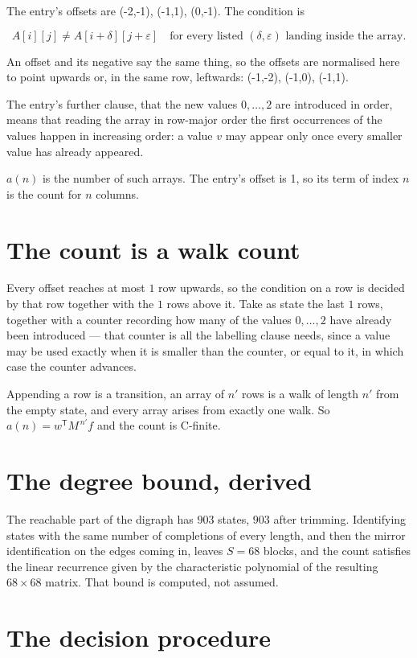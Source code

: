 \documentclass[11pt]{article}
\theoremstyle{definition}
\begin{document}
The entry's offsets are (-2,-1), (-1,1), (0,-1). The condition is

\[A[i][j] \ne A[i{+}\delta][j{+}\varepsilon]\quad\text{for every listed }(\delta,\varepsilon)\text{ landing inside the array.}\]

An offset and its negative say the same thing, so the offsets are normalised here to point upwards or, in the same row, leftwards: (-1,-2), (-1,0), (-1,1).

The entry's further clause, that the new values $0,\dots,2$ are introduced in order, means that reading the array in row-major order the first occurrences of the values happen in increasing order: a value $v$ may appear only once every smaller value has already appeared.

$a(n)$ is the number of such arrays. The entry's offset is 1, so its term of index $n$ is the count for $n$ columns.

\section{The count is a walk count}

Every offset reaches at most $1$ row upwards, so the condition on a row is decided by that row together with the $1$ rows above it. Take as state the last $1$ rows, together with a counter recording how many of the values $0,\dots,2$ have already been introduced --- that counter is all the labelling clause needs, since a value may be used exactly when it is smaller than the counter, or equal to it, in which case the counter advances.

Appending a row is a transition, an array of $n'$ rows is a walk of length $n'$ from the empty state, and every array arises from exactly one walk. So $a(n) = w^{\mathsf T}M^{\,n'}f$ and the count is C-finite.

\section{The degree bound, derived}

The reachable part of the digraph has $903$ states, $903$ after trimming. Identifying states with the same number of completions of every length, and then the mirror identification on the edges coming in, leaves $S = 68$ blocks, and the count satisfies the linear recurrence given by the characteristic polynomial of the resulting $68\times68$ matrix. That bound is computed, not assumed.

\section{The decision procedure}
\end{document}
